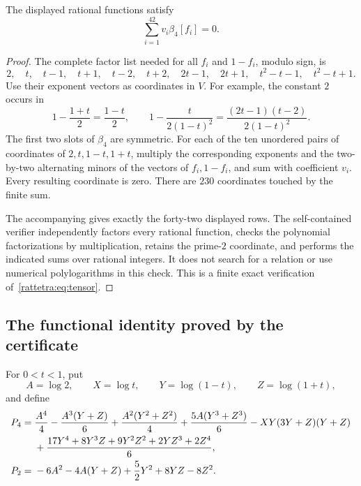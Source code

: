 \begin{lemma}
\label{rattetra:lem:certificate}
The displayed rational functions satisfy
\begin{equation}
 \sum_{i=1}^{42}v_i\beta_4[f_i]=0.
\label{rattetra:eq:tensor}
\end{equation}
\end{lemma}

\begin{proof}
The complete factor list needed for all $f_i$ and $1-f_i$, modulo
sign, is
\[
 2,\quad t,\quad t-1,\quad t+1,\quad
 t-2,\quad t+2,\quad2t-1,\quad2t+1,\quad
 t^2-t-1,\quad t^2-t+1.
\]
Use their exponent vectors as coordinates in $V$. For example,
the constant $2$ occurs in
\[
 1-\frac{1+t}{2}=\frac{1-t}{2},\qquad
 1-\frac{t}{2(1-t)^2}
   =\frac{(2t-1)(t-2)}{2(1-t)^2}.
\]
The first two slots of $\beta_4$ are symmetric. For each of the ten
unordered pairs of coordinates of $2,t,1-t,1+t$, multiply the
corresponding exponents and the two-by-two alternating minors of
the vectors of $f_i,1-f_i$, and sum with coefficient $v_i$.
Every resulting coordinate is zero. There are $230$ coordinates
touched by the finite sum.

The accompanying  gives
exactly the forty-two displayed rows. The self-contained verifier
independently factors every rational function, checks the polynomial
factorizations by multiplication, retains the prime-$2$ coordinate,
and performs the indicated sums over rational integers. It does not
search for a relation or use numerical polylogarithms in this check.
This is a finite exact verification of~\eqref{rattetra:eq:tensor}.
\end{proof}

\subsection{The functional identity proved by the certificate}

For $0<t<1$, put
\[
 A=\log2,\qquad X=\log t,\qquad
 Y=\log(1-t),\qquad Z=\log(1+t),
\]
and define
\begin{align}
P_4={}&\frac{A^4}{4}-\frac{A^3(Y+Z)}6
       +\frac{A^2(Y^2+Z^2)}4+\frac{5A(Y^3+Z^3)}6
       -XY(3Y+Z)(Y+Z)\notag\\
 &+\frac{17Y^4+8Y^3Z+9Y^2Z^2+2YZ^3+2Z^4}{6},
 \label{rattetra:eq:P4}\\
P_2={}&-6A^2-4A(Y+Z)+\frac52Y^2+8YZ-8Z^2.
 \label{rattetra:eq:P2}
\end{align}

